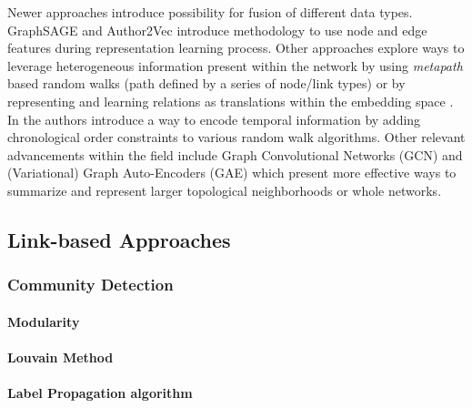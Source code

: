 \documentclass[
acmsmall,
nonacm,
screen,
acmthm]{../../scripts/pandoc/templates/acmart}
\begin{document}
Newer approaches introduce possibility for fusion of different data
types. GraphSAGE \citep{hamiltonInductiveRepresentationLearning2018} and
Author2Vec \citep{wuAuthor2VecFrameworkGenerating2020} introduce
methodology to use node and edge features during representation learning
process. Other approaches explore ways to leverage heterogeneous
information present within the network by using \emph{metapath} based
random walks (path defined by a series of node/link types)
\citep{dongMetapath2vecScalableRepresentation2017} or by representing
and learning relations as translations within the embedding space
\citep{bordesTranslatingEmbeddingsModeling2013}. In
\citet{nguyenContinuousTimeDynamicNetwork2018} the authors introduce a
way to encode temporal information by adding chronological order
constraints to various random walk algorithms. Other relevant
advancements within the field include Graph Convolutional Networks (GCN)
\citep{kipfSemiSupervisedClassificationGraph2017a} and (Variational)
Graph Auto-Encoders (GAE) \citep{kipfVariationalGraphAutoEncoders2016}
which present more effective ways to summarize and represent larger
topological neighborhoods or whole networks.

\hypertarget{link-based-approaches}{%
\subsection{Link-based Approaches}\label{link-based-approaches}}

\hypertarget{community-detection-1}{%
\subsubsection{Community Detection}\label{community-detection-1}}

\hypertarget{modularity}{%
\paragraph{Modularity}\label{modularity}}

\hypertarget{louvain-method}{%
\paragraph{Louvain Method}\label{louvain-method}}

\hypertarget{label-propagation-algorithm}{%
\paragraph{Label Propagation
algorithm}\label{label-propagation-algorithm}}
\end{document}
